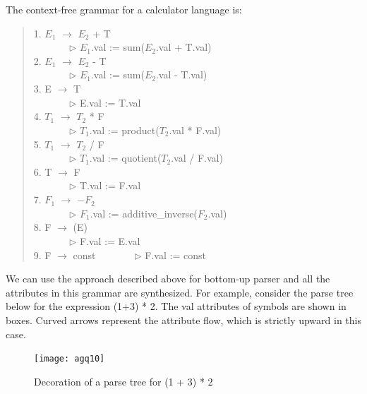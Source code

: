 \documentclass[a4paper,12pt]{article}
\begin{document}
The context-free grammar for a calculator language is:\\
\begin{quote}
1. $E_1$ $\longrightarrow$ $E_2$ + T \\
\verb+       +$\triangleright$ $E_1$.val := sum($E_2$.val + T.val)\\
2. $E_1$ $\longrightarrow$ $E_2$ - T \\
\verb+       +$\triangleright$ $E_1$.val := sum($E_2$.val - T.val)\\
3. E $\longrightarrow$  T \\
\verb+       +$\triangleright$ E.val := T.val\\
4. $T_1$ $\longrightarrow$ $T_2$ * F \\
\verb+       +$\triangleright$ $T_1$.val := product($T_2$.val * F.val)\\
5. $T_1$ $\longrightarrow$ $T_2$ / F \\
\verb+       +$\triangleright$ $T_1$.val := quotient($T_2$.val / F.val)\\
6. T $\longrightarrow$  F \\
\verb+       +$\triangleright$ T.val := F.val\\
7. $F_1$ $\longrightarrow$ $-F_2$\\
\verb+       +$\triangleright$ $F_1$.val := additive\_inverse($F_2$.val)\\
8. F $\longrightarrow$  (E) \\
\verb+       +$\triangleright$ F.val := E.val\\
9. F $\longrightarrow$ const
\verb+       +$\triangleright$ F.val := const\\
\end{quote}
We can use the approach described above for bottom-up parser and all the attributes in this grammar are synthesized.
For example, consider the parse tree below for the expression (1+3) * 2. The val attributes of symbols are shown in boxes. Curved arrows represent the attribute flow, which is strictly upward in this case.
\begin{figure}[!hbp]
\centering
\texttt{[image: agq10]}
\caption{Decoration of a parse tree for (1 + 3) * 2 }
\end{figure}
\end{document}
